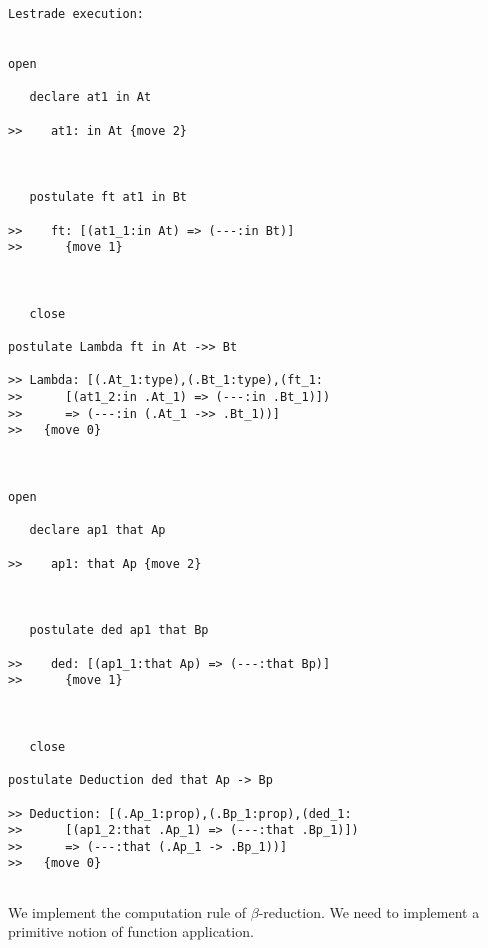 \documentclass{article}
\begin{document}
\begin{verbatim}Lestrade execution:


open

   declare at1 in At

>>    at1: in At {move 2}



   postulate ft at1 in Bt

>>    ft: [(at1_1:in At) => (---:in Bt)]
>>      {move 1}



   close

postulate Lambda ft in At ->> Bt

>> Lambda: [(.At_1:type),(.Bt_1:type),(ft_1:
>>      [(at1_2:in .At_1) => (---:in .Bt_1)])
>>      => (---:in (.At_1 ->> .Bt_1))]
>>   {move 0}



open

   declare ap1 that Ap

>>    ap1: that Ap {move 2}



   postulate ded ap1 that Bp

>>    ded: [(ap1_1:that Ap) => (---:that Bp)]
>>      {move 1}



   close

postulate Deduction ded that Ap -> Bp

>> Deduction: [(.Ap_1:prop),(.Bp_1:prop),(ded_1:
>>      [(ap1_2:that .Ap_1) => (---:that .Bp_1)])
>>      => (---:that (.Ap_1 -> .Bp_1))]
>>   {move 0}


\end{verbatim}

We implement the computation rule of $\beta$-reduction.  We need to implement a primitive notion of function application.
\end{document}
